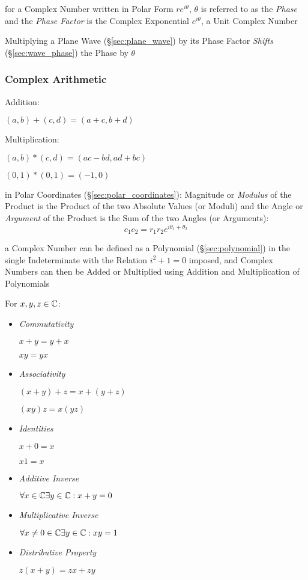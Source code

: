 for a Complex Number written in Polar Form $re^{i\theta}$, $\theta$ is referred
to as the \emph{Phase} and the \emph{Phase Factor} is the Complex Exponential
$e^{i\theta}$, a Unit Complex Number

Multiplying a Plane Wave (\S\ref{sec:plane_wave}) by its Phase Factor
\emph{Shifts} (\S\ref{sec:wave_phase}) the Phase by $\theta$



\subsubsection{Complex Arithmetic}\label{sec:complex_arithmetic}

Addition:

$(a,b) + (c,d) = (a + c, b + d)$

Multiplication:

$(a,b)*(c,d) = (ac - bd, ad + bc)$

$(0,1)*(0,1) = (-1, 0)$

in Polar Coordinates (\S\ref{sec:polar_coordinates}): Magnitude or
\emph{Modulus} of the Product is the Product of the two Absolute
Values (or Moduli) and the Angle or \emph{Argument} of the Product is
the Sum of the two Angles (or Arguments):
\[
  c_1 c_2 = r_1 r_2 e^{i\theta_1 + \theta_2}
\]

a Complex Number can be defined as a Polynomial (\S\ref{sec:polynomial}) in the
single Indeterminate with the Relation $i^2 + 1 = 0$ imposed, and Complex
Numbers can then be Added or Multiplied using Addition and Multiplication of
Polynomials



For $x,y,z \in \mathbb{C}$:
\begin{itemize}
\item \emph{Commutativity}

$x + y = y + x$

$xy = yx$


\item \emph{Associativity}

$(x + y) + z = x + (y + z)$

$(xy)z = x(yz)$


\item \emph{Identities}

$x + 0 = x$

$x1 = x$


\item \emph{Additive Inverse}

$\forall x \in \mathbb{C} \exists y \in \mathbb{C} : x + y = 0$


\item \emph{Multiplicative Inverse}

$\forall x \neq 0 \in \mathbb{C} \exists y \in \mathbb{C} : xy = 1$


\item \emph{Distributive Property}

$z (x + y) = zx + zy$

\end{itemize}



